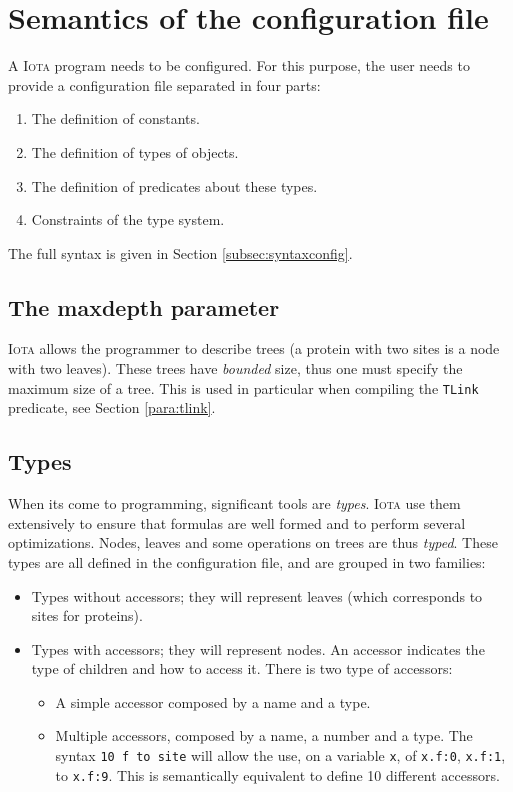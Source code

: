 \documentclass[10pt,a4paper]{article}
\newcommand\Iota{\textsc{Iota}}
\newcommand{\ocaml}{\texttt}
\begin{document}
\section{Semantics of the configuration file}
A \Iota{} program needs to be configured. For this purpose, the user needs to provide a configuration file separated in four parts:
\begin{enumerate}
\item The definition of constants.
\item The definition of types of objects.
\item The definition of predicates about these types.
\item Constraints of the type system.
\end{enumerate}

The full syntax is given in Section \ref{subsec:syntaxconfig}.
\subsection{The maxdepth parameter}
\Iota{} allows the programmer to describe trees (a protein with two sites is a node with two leaves). These trees have \emph{bounded} size, thus one must specify the maximum size of a tree. This is used in particular when compiling the \ocaml{TLink} predicate, see Section \ref{para:tlink}.

\subsection{Types}
When its come to programming, significant tools are \emph{types}. \Iota{} use them extensively to ensure that formulas are well formed and to perform several optimizations.
Nodes, leaves and some operations on trees are thus \emph{typed}. These types are all defined in the configuration file, and are grouped in two families:
\begin{itemize}
\item Types without accessors; they will represent leaves (which corresponds to sites for proteins).
\item Types with accessors; they will represent nodes. An accessor indicates the type of children and how to access it. There is two type of accessors:
  \begin{itemize}
  \item A simple accessor composed by a name and a type.
  \item Multiple accessors, composed by a name, a number and a type. The syntax \ocaml{10 f to site} will allow the use, on a variable \ocaml{x}, of \ocaml{x.f:0}, \ocaml{x.f:1}, to \ocaml{x.f:9}. This is semantically equivalent to define 10 different accessors.
  \end{itemize}
\end{itemize}
\end{document}

